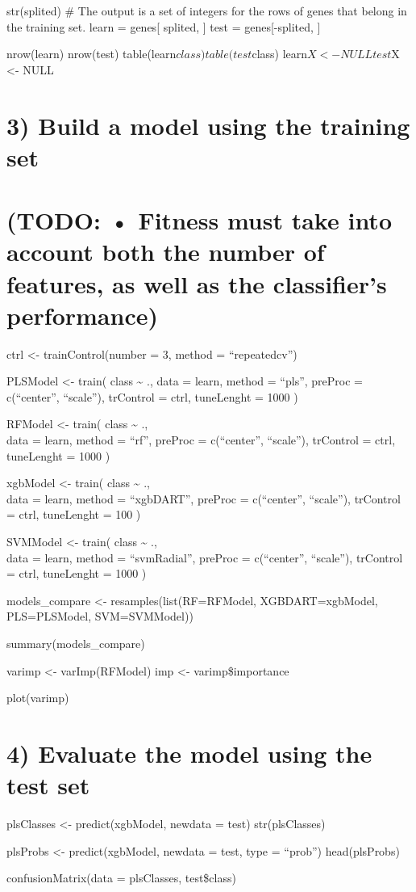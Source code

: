 \documentclass[]{article}
\begin{document}
str(splited) \# The output is a set of integers for the rows of genes
that belong in the training set. learn = genes{[} splited, {]} test =
genes{[}-splited, {]}

nrow(learn) nrow(test) table(learn\(class) table(test\)class)
learn\(X <- NULL test\)X \textless{}- NULL

\hypertarget{build-a-model-using-the-training-set}{%
\section{3) Build a model using the training
set}\label{build-a-model-using-the-training-set}}

\hypertarget{todo-fitness-must-take-into-account-both-the-number-of-features-as-well-as-the-classifiers-performance}{%
\section{(TODO: • Fitness must take into account both the number of
features, as well as the classifier's
performance)}\label{todo-fitness-must-take-into-account-both-the-number-of-features-as-well-as-the-classifiers-performance}}

ctrl \textless{}- trainControl(number = 3, method = ``repeatedcv'')

PLSModel \textless{}- train( class \textasciitilde{} ., data = learn,
method = ``pls'', preProc = c(``center'', ``scale''), trControl = ctrl,
tuneLenght = 1000 )

RFModel \textless{}- train( class \textasciitilde{} .,\\
data = learn, method = ``rf'', preProc = c(``center'', ``scale''),
trControl = ctrl, tuneLenght = 1000 )

xgbModel \textless{}- train( class \textasciitilde{} .,\\
data = learn, method = ``xgbDART'', preProc = c(``center'', ``scale''),
trControl = ctrl, tuneLenght = 100 )

SVMModel \textless{}- train( class \textasciitilde{} .,\\
data = learn, method = ``svmRadial'', preProc = c(``center'',
``scale''), trControl = ctrl, tuneLenght = 1000 )

models\_compare \textless{}- resamples(list(RF=RFModel,
XGBDART=xgbModel, PLS=PLSModel, SVM=SVMModel))

summary(models\_compare)

varimp \textless{}- varImp(RFModel) imp \textless{}- varimp\$importance

plot(varimp)

\hypertarget{evaluate-the-model-using-the-test-set}{%
\section{4) Evaluate the model using the test
set}\label{evaluate-the-model-using-the-test-set}}

plsClasses \textless{}- predict(xgbModel, newdata = test)
str(plsClasses)

plsProbs \textless{}- predict(xgbModel, newdata = test, type = ``prob'')
head(plsProbs)

confusionMatrix(data = plsClasses, test\$class)
\end{document}
